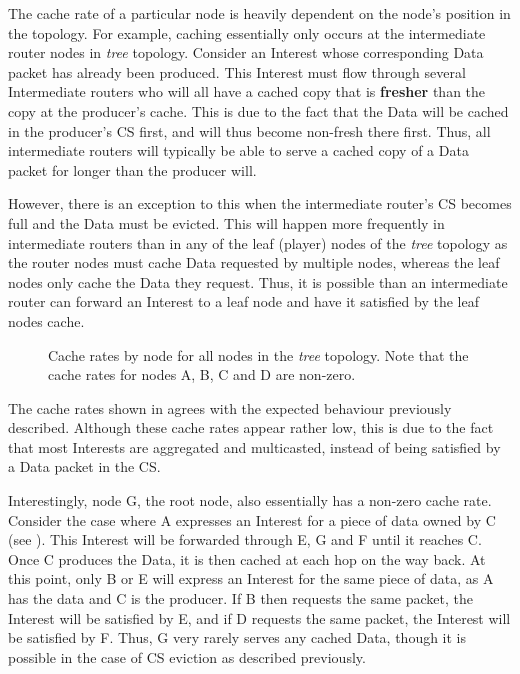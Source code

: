 The cache rate of a particular node is heavily dependent on the node's position in the topology. For example, caching essentially only occurs at the intermediate router nodes in \textit{tree} topology. Consider an Interest whose corresponding Data packet has already been produced. This Interest must flow through several Intermediate routers who will all have a cached copy that is \textbf{fresher} than the copy at the producer's cache. This is due to the fact that the Data will be cached in the producer's CS first, and will thus become non-fresh there first. Thus, all intermediate routers will typically be able to serve a cached copy of a Data packet for longer than the producer will. 

However, there is an exception to this when the intermediate router's CS becomes full and the Data must be evicted. This will happen more frequently in intermediate routers than in any of the leaf (player) nodes of the \textit{tree} topology as the router nodes must cache Data requested by multiple nodes, whereas the leaf nodes only cache the Data they request. Thus, it is possible than an intermediate router can forward an Interest to a leaf node and have it satisfied by the leaf nodes cache.

\begin{figure}[H]
    \centering
    \caption{Cache rates by node for all nodes in the \textit{tree} topology. Note that the cache rates for nodes A, B, C and D are non-zero.}
    \label{fig:eval:caching:cache-rate-tree}
\end{figure}

The cache rates shown in  agrees with the expected behaviour previously described. Although these cache rates appear rather low, this is due to the fact that most Interests are aggregated and multicasted, instead of being satisfied by a Data packet in the CS.

Interestingly, node G, the root node, also essentially has a non-zero cache rate. Consider the case where A expresses an Interest for a piece of data owned by C (see ). This Interest will be forwarded through E, G and F until it reaches C. Once C produces the Data, it is then cached at each hop on the way back. At this point, only B or E will express an Interest for the same piece of data, as A has the data and C is the producer. If B then requests the same packet, the Interest will be satisfied by E, and if D requests the same packet, the Interest will be satisfied by F. Thus, G very rarely serves any cached Data, though it is possible in the case of CS eviction as described previously. 

